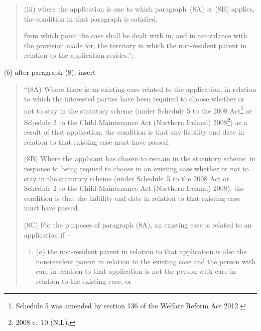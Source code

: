 \documentclass[12pt,a4paper]{article}
\begin{document}
\begin{enumerate}
\begin{quotation}
\begin{enumerate}
\begin{enumerate}
(iii) where the application is one to which paragraph~(8A) or (8B) applies,
the condition in that paragraph is satisfied,
\end{enumerate}
\end{enumerate}
from which point the case shall be dealt with in, and in accordance with the
provision made for, the territory in which the non-resident parent in relation to the 
application resides.'';
\end{quotation}

($b$) after paragraph (8), insert---

\begin{quotation}
``(8A) Where there is an existing case related to the application, in relation to
which the interested parties have been required to choose whether or not to stay in 
the statutory scheme (under Schedule 5 to the 2008 Act\footnote{Schedule 5 was amended by section 136 of the Welfare Reform Act 2012.} or Schedule 2 to the Child
Maintenance Act (Northern Ireland) 2008\footnote{2008 c.~10 (N.I.).}) as a result of that application, the
condition is that any liability end date in relation to that existing case must have
passed.

(8B) Where the applicant has chosen to remain in the statutory scheme, in response
to being requied to choose in an existing case whether or not to stay in the statutory 
scheme (under Schedule~5 to the 2008 Act or Schedule 2 to the Child Maintenance 
Act (Northern Ireland) 2008), the condition is that the liability end date in relation to
that existing case must have passed.

(8C) For the purposes of paragraph (8A), an existing case is related to an
application if---
\begin{enumerate}\item[]
($a$) the non-resident parent in relation to that application is also the non-resident
parent in relation to the existing case and the person with care in relation to
that application is not the person with care in relation to the existing case, or


\end{enumerate}
\end{quotation}
\end{enumerate}
\end{document}
